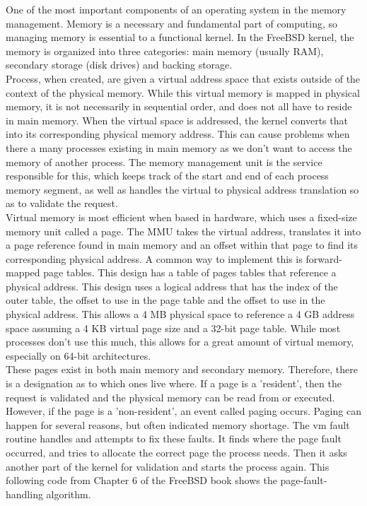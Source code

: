 \documentclass[titlepage]{article}
\begin{document}
\begin{singlespace}
One of the most important components of an operating system in the memory management. Memory is a necessary and fundamental part of computing, so managing memory is essential to a functional kernel. In the FreeBSD kernel,  the memory is organized into three categories: main memory (usually RAM), secondary storage (disk drives) and backing storage. \\
Process, when created, are given a virtual address space that exists outside of the context of the physical memory. While this virtual memory is mapped in physical memory, it is not necessarily in sequential order, and does not all have to reside in main memory. When the virtual space is addressed, the kernel converts that into its corresponding physical memory address. This can cause problems when there a many processes existing in main memory as we don't want to access the memory of another process. The memory management unit is the service responsible for this, which keeps track of the start and end of each process memory segment, as well as handles the virtual to physical address translation so as to validate the request. \\
Virtual memory is most efficient when based in hardware, which uses a fixed-size memory unit called a page. The MMU takes the virtual address, translates it into a page reference found in main memory and an offset within that page to find its corresponding physical address. A common way to implement this is forward-mapped page tables. This design has a table of pages tables that reference a physical address. This design uses a logical address that has the index of the outer table, the offset to use in the page table and the offset to use in the physical address. This allows a 4 MB physical space to reference a 4 GB address space assuming a 4 KB virtual page size and a 32-bit page table. While most processes don't use this much, this allows for a great amount of virtual memory, especially on 64-bit architectures. \\
These pages exist in both main memory and secondary memory. Therefore, there is a designation as to which ones live where. If a page is a 'resident', then the request is validated and the physical memory can be read from or executed. However, if the page is a 'non-resident’, an event called paging occurs. Paging can happen for several reasons, but often indicated memory shortage. The vm fault routine handles and attempts to fix these faults. It finds where the page fault occurred, and tries to allocate the correct page the process needs. Then it asks another part of the kernel for validation and starts the process again. This following code from Chapter 6 of the FreeBSD book \cite{freebsdch6} shows the page-fault-handling algorithm. \\


\end{singlespace}
\end{document}
